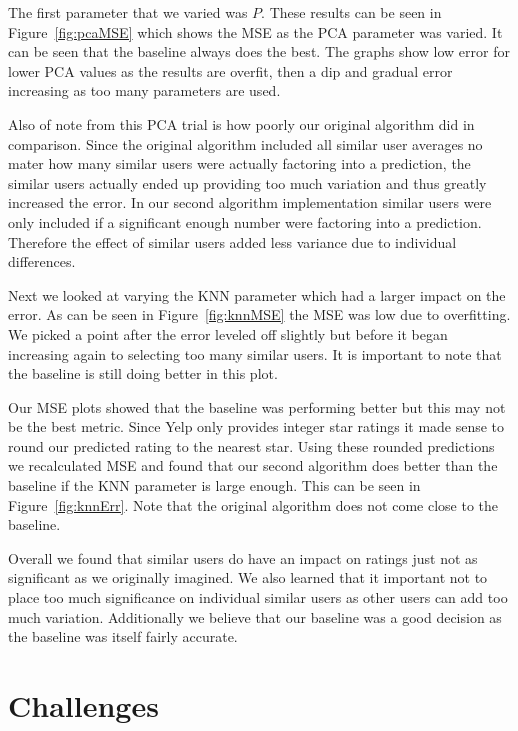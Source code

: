 \documentclass[10pt,twocolumn,letterpaper]{article}
\begin{document}
The first parameter that we varied was $P$. These results can be seen in Figure~\ref{fig:pcaMSE} which shows the MSE as the PCA parameter was varied. It can be seen that the baseline always does the best. The graphs show low error for lower PCA values as the results are overfit, then a dip and gradual error increasing as too many parameters are used.

Also of note from this PCA trial is how poorly our original algorithm did in comparison. Since the original algorithm included all similar user averages no mater how many similar users were actually factoring into a prediction, the similar users actually ended up providing too much variation and thus greatly increased the error. In our second algorithm implementation similar users were only included if a significant enough number were factoring into a prediction. Therefore the effect of similar users added less variance due to individual differences.

Next we looked at varying the KNN parameter which had a larger impact on the error. As can be seen in Figure~\ref{fig:knnMSE} the MSE was low due to overfitting. We picked a point after the error leveled off slightly but before it began increasing again to selecting too many similar users. It is important to note that the baseline is still doing better in this plot.

Our MSE plots showed that the baseline was performing better but this may not be the best metric. Since Yelp only provides integer star ratings it made sense to round our predicted rating to the nearest star. Using these rounded predictions we recalculated MSE and found that our second algorithm does better than the baseline if the KNN parameter is large enough. This can be seen in Figure~\ref{fig:knnErr}. Note that the original algorithm does not come close to the baseline.

Overall we found that similar users do have an impact on ratings just not as significant as we originally imagined. We also learned that it important not to place too much significance on individual similar users as other users can add too much variation. Additionally we believe that our baseline was a good decision as the baseline was itself fairly accurate. 


\section{Challenges}
\end{document}
